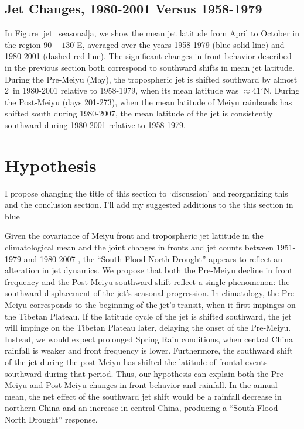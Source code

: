 \documentclass[draft,grl]{AGUTeX}
\begin{document}
\begin{article}
\subsection{Jet Changes, 1980-2001 Versus 1958-1979}

	In Figure \ref{jet_seasonal}a, we show the mean jet latitude from April to October in the region $90-130^\circ$E, averaged over the years 1958-1979 (blue solid line) and 1980-2001 (dashed red line). The significant changes in front behavior described in the previous section both correspond to southward shifts in mean jet latitude. During the Pre-Meiyu (May), the tropospheric jet is shifted southward by almost 2\textdegree\ in 1980-2001 relative to 1958-1979, when its mean latitude was $\approx 41^\circ$N. During the Post-Meiyu (days 201-273), when the mean latitude of Meiyu rainbands has shifted south during 1980-2007, the mean latitude of the jet is consistently southward during 1980-2001 relative to 1958-1979.
	
	
\section{Hypothesis}

{\color{red}  I propose changing the title of this section to `discussion' and reorganizing this and the conclusion section. I'll add my suggested additions to the this section in blue }  

	Given the covariance of Meiyu front and tropospheric jet latitude in the climatological mean and the joint changes in fronts and jet counts between 1951-1979 and 1980-2007 , the ``South Flood-North Drought'' appears to reflect an alteration in jet dynamics. We propose that both the Pre-Meiyu decline in front frequency and the Post-Meiyu southward shift reflect a single phenomenon: the southward displacement of the jet's seasonal progression. In climatology, the Pre-Meiyu corresponds to the beginning of the jet's transit, when it first impinges on the Tibetan Plateau. If the latitude cycle of the jet is shifted southward, the jet will impinge on the Tibetan Plateau later, delaying the onset of the Pre-Meiyu. Instead, we would expect prolonged Spring Rain conditions, when central China rainfall is weaker and front frequency is lower. Furthermore, the southward shift of the jet during the post-Meiyu has shifted the latitude of frontal events southward during that period. Thus, our hypothesis can explain both the Pre-Meiyu and Post-Meiyu changes in front behavior and rainfall. In the annual mean, the net effect of the southward jet shift would be a rainfall decrease in northern China and an increase in central China, producing a ``South Flood-North Drought'' response.
	

\end{article}
\end{document}

